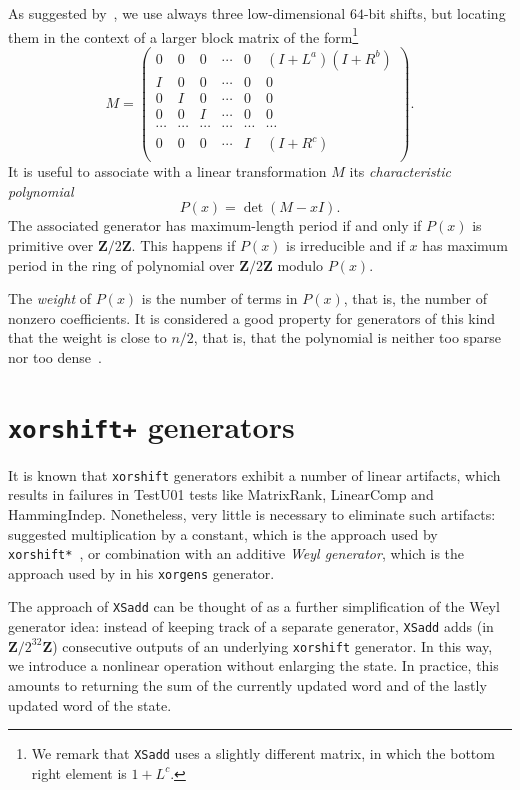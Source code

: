 \documentclass{acmsmalltr}
\newcommand{\Z}{\mathbf Z}
\newcommand{\xorshift}[1][]{\texttt{xorshift#1}\xspace}
\newcommand{\xorshifts}[1][]{\texttt{xorshift#1*}\xspace}
\newcommand{\xorshiftp}[1][]{\texttt{xorshift#1+}\xspace}
\newcommand{\xorgens}[1][]{\texttt{xorgens#1}\xspace}
\newcommand{\xsadd}{\texttt{XSadd}\xspace}
\begin{document}
As suggested by~, we use always three low-dimensional
$64$-bit shifts, but locating them in the context of a larger block matrix of the
form\footnote{We remark that \xsadd uses a slightly different matrix, in which the bottom right
element is $1+L^c$.}
\[
M=\left(\begin{matrix}
0 & 0 & 0 & \cdots & 0 & ( I + L^a ) ( I+ R^b )\\
I & 0 & 0 & \cdots & 0 & 0\\
0 & I & 0 & \cdots & 0 & 0\\
0 & 0 & I & \cdots & 0 & 0\\
\cdots&\cdots&\cdots&\cdots&\cdots&\cdots\\
0 & 0 & 0 & \cdots & I & ( I + R^c ) \\
\end{matrix}\right).
\]
It is useful to associate with a linear transformation $M$ its \emph{characteristic polynomial}
\[
P(x)=\operatorname{det}(M-xI).
\]
The associated generator has maximum-length period if and only if $P(x)$ is
primitive over $\Z/2\Z$. This happens if $P(x)$ is irreducible and if $x$ has
maximum period in the ring of polynomial over $\Z/2\Z$ modulo $P(x)$.

The \emph{weight} of $P(x)$ is the number
of terms in $P(x)$, that is, the number of nonzero coefficients. It is considered a good property for generators
of this kind that the weight is close to $n/2$, that is, that the polynomial
is neither too sparse nor too dense~\cite{ComHCRBS}.

\section{{\fontsize{11pt}{11pt}\selectfont\xorshiftp} generators}

It is known that \xorshift generators exhibit a number of linear artifacts,
which results in failures in TestU01 tests like MatrixRank, LinearComp and
HammingIndep. Nonetheless, very little is necessary to eliminate such artifacts:
 suggested multiplication by a constant, which is the approach used
by \xorshifts~\cite{VigEEMXGS}, or combination with an additive \emph{Weyl generator}, which is
the approach used by  in his \xorgens
generator.

The approach of \xsadd can be thought of as a further simplification of the
Weyl generator idea: instead of keeping track of a separate generator, \xsadd
adds (in $\Z/2^{32}\Z$) consecutive outputs of an underlying \xorshift
generator.
In this way, we introduce a nonlinear operation without
enlarging the state. In practice, this amounts to returning the sum of the currently
updated word and of the lastly updated word of the state. 
\end{document}
